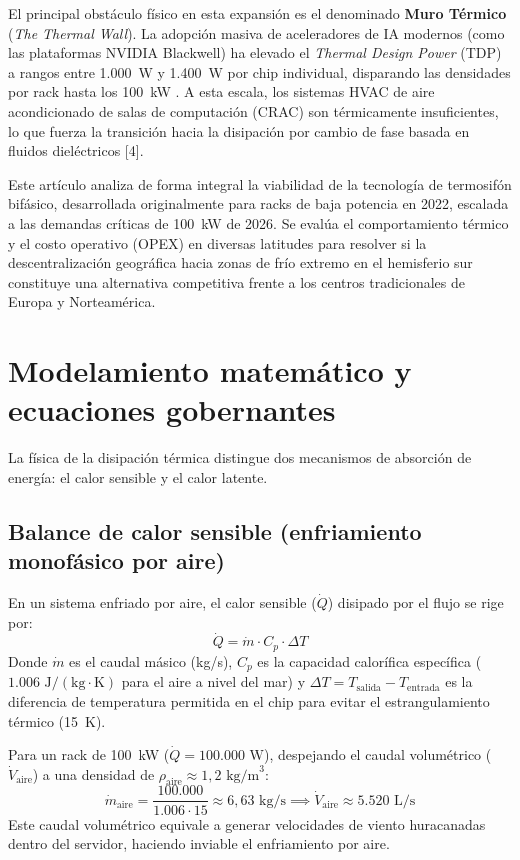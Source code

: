 \documentclass[journal]{IEEEtran}
\begin{document}
El principal obst\'aculo f\'isico en esta expansi\'on es el denominado \textbf{Muro T\'ermico} (\emph{The Thermal Wall}). La adopci\'on masiva de aceleradores de IA modernos (como las plataformas NVIDIA Blackwell) ha elevado el \emph{Thermal Design Power} (TDP) a rangos entre 1.000~W y 1.400~W por chip individual, disparando las densidades por rack hasta los 100~kW \cite{rohsenow1952}. A esta escala, los sistemas HVAC de aire acondicionado de salas de computaci\'on (CRAC) son t\'ermicamente insuficientes, lo que fuerza la transici\'on hacia la disipaci\'on por cambio de fase basada en fluidos diel\'ectricos [4].

Este art\'iculo analiza de forma integral la viabilidad de la tecnolog\'ia de termosif\'on bif\'asico, desarrollada originalmente para racks de baja potencia en 2022, escalada a las demandas cr\'iticas de 100~kW de 2026. Se eval\'ua el comportamiento t\'ermico y el costo operativo (OPEX) en diversas latitudes para resolver si la descentralizaci\'on geogr\'afica hacia zonas de fr\'io extremo en el hemisferio sur constituye una alternativa competitiva frente a los centros tradicionales de Europa y Norteam\'erica.

\section{Modelamiento matem\'atico y ecuaciones gobernantes}
La f\'isica de la disipaci\'on t\'ermica distingue dos mecanismos de absorci\'on de energ\'ia: el calor sensible y el calor latente.

\subsection{Balance de calor sensible (enfriamiento monof\'asico por aire)}
En un sistema enfriado por aire, el calor sensible ($\dot{Q}$) disipado por el flujo se rige por:
\begin{equation}
\dot{Q} = \dot{m} \cdot C_p \cdot \Delta T
\end{equation}
Donde $\dot{m}$ es el caudal m\'asico (kg/s), $C_p$ es la capacidad calor\'ifica espec\'ifica ($1.006\text{ J}/(\text{kg}\cdot\text{K})$ para el aire a nivel del mar) y $\Delta T = T_{\text{salida}} - T_{\text{entrada}}$ es la diferencia de temperatura permitida en el chip para evitar el estrangulamiento t\'ermico (15~K).

Para un rack de 100~kW ($\dot{Q} = 100.000\text{ W}$), despejando el caudal volum\'etrico ($\dot{V}_{\text{aire}}$) a una densidad de $\rho_{\text{aire}} \approx 1,2\text{ kg/m}^3$:
\begin{equation}
\dot{m}_{\text{aire}} = \frac{100.000}{1.006 \cdot 15} \approx 6,63\text{ kg/s} \implies \dot{V}_{\text{aire}} \approx 5.520\text{ L/s}
\end{equation}
Este caudal volum\'etrico equivale a generar velocidades de viento huracanadas dentro del servidor, haciendo inviable el enfriamiento por aire.
\end{document}

